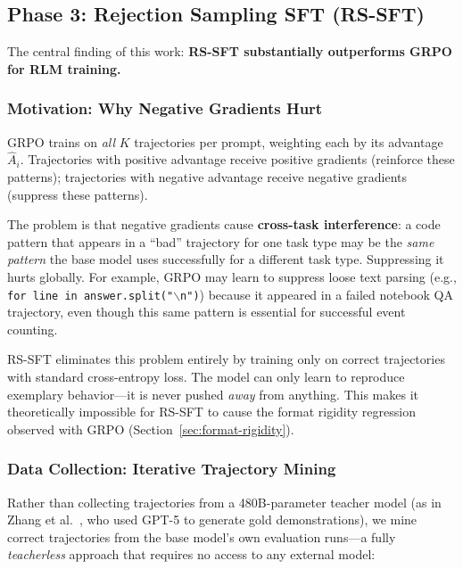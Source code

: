 \documentclass{article}
\begin{document}
\subsection{Phase 3: Rejection Sampling SFT (RS-SFT)}
\label{sec:rs-sft}

The central finding of this work: \textbf{RS-SFT substantially outperforms GRPO for RLM training.}

\subsubsection{Motivation: Why Negative Gradients Hurt}

GRPO trains on \emph{all} $K$ trajectories per prompt, weighting each by its advantage $\hat{A}_i$. Trajectories with positive advantage receive positive gradients (reinforce these patterns); trajectories with negative advantage receive negative gradients (suppress these patterns).

The problem is that negative gradients cause \textbf{cross-task interference}: a code pattern that appears in a ``bad'' trajectory for one task type may be the \emph{same pattern} the base model uses successfully for a different task type. Suppressing it hurts globally. For example, GRPO may learn to suppress loose text parsing (e.g., \texttt{for line in answer.split("$\backslash$n")}) because it appeared in a failed notebook QA trajectory, even though this same pattern is essential for successful event counting.

RS-SFT eliminates this problem entirely by training only on correct trajectories with standard cross-entropy loss. The model can only learn to reproduce exemplary behavior---it is never pushed \emph{away} from anything. This makes it theoretically impossible for RS-SFT to cause the format rigidity regression observed with GRPO (Section~\ref{sec:format-rigidity}).

\subsubsection{Data Collection: Iterative Trajectory Mining}

Rather than collecting trajectories from a 480B-parameter teacher model (as in Zhang et al.~\cite{zhang2026rlm}, who used GPT-5 to generate gold demonstrations), we mine correct trajectories from the base model's own evaluation runs---a fully \emph{teacherless} approach that requires no access to any external model:
\end{document}
